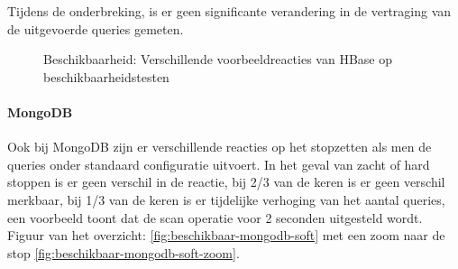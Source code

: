 Tijdens de onderbreking, is er geen significante verandering in de vertraging van de uitgevoerde queries gemeten. 
\begin{figure}[ht!] 
	\centering
	\caption{Beschikbaarheid: Verschillende voorbeeldreacties van HBase op beschikbaarheidstesten }
	\label{fig:beschikbaar-hbase-1}
\end{figure}

\paragraph{MongoDB}
Ook bij MongoDB zijn er verschillende reacties op het stopzetten als men de queries onder standaard configuratie uitvoert. In het geval van zacht of hard stoppen is er geen verschil in de reactie, bij 2/3 van de keren is er geen verschil merkbaar, bij 1/3 van de keren is er tijdelijke verhoging van het aantal queries, een voorbeeld toont dat de scan operatie voor 2 seconden uitgesteld wordt. Figuur van het overzicht: \ref{fig:beschikbaar-mongodb-soft} met een zoom naar de stop \ref{fig:beschikbaar-mongodb-soft-zoom}.

